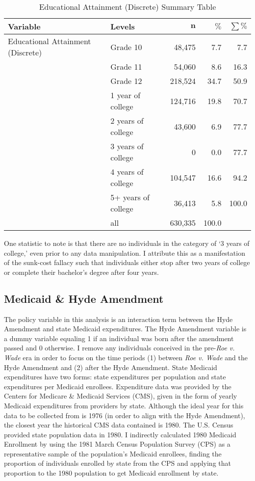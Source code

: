         \begingroup\footnotesize
        \begin{longtable}{ll|rrr}
        \caption{Educational Attainment (Discrete) Summary Table} \\
        \label{edu2_table}
         \textbf{Variable} & \textbf{Levels} & $\mathbf{n}$ & $\mathbf{\%}$ & $\mathbf{\sum \%}$ \\
          \hline
        Educational Attainment (Discrete) & Grade 10 & 48,475 & 7.7 & 7.7 \\
        & Grade 11 & 54,060 & 8.6 & 16.3 \\
        & Grade 12 & 218,524 & 34.7 & 50.9 \\
        & 1 year of college & 124,716 & 19.8 & 70.7 \\
        & 2 years of college & 43,600 & 6.9 & 77.7 \\
        & 3 years of college & 0 & 0.0 & 77.7 \\
        & 4 years of college & 104,547 & 16.6 & 94.2 \\
        & 5+ years of college & 36,413 & 5.8 & 100.0 \\
        \hline
        & all & 630,335 & 100.0 &  \\
        \hline
        \hline
        \end{longtable}
        \endgroup

        One statistic to note is that there are no individuals in the category of `3 years of college,' even prior to any data manipulation. I attribute this as a manifestation of the sunk-cost fallacy such that individuals either stop after two years of college or complete their bachelor's degree after four years.


    \subsection{Medicaid \& Hyde Amendment}
        The policy variable in this analysis is an interaction term between the Hyde Amendment and state Medicaid expenditures. The Hyde Amendment variable is a dummy variable equaling 1 if an individual was born after the amendment passed and 0 otherwise. I remove any individuals conceived in the pre-\textit{Roe v. Wade} era in order to focus on the time periods (1) between \textit{Roe v. Wade} and the Hyde Amendment and (2) after the Hyde Amendment. State Medicaid expenditures have two forms: state expenditures per population and state expenditures per Medicaid enrollees. Expenditure data was provided by the Centers for Medicare \& Medicaid Services (CMS), given in the form of yearly Medicaid expenditures from providers by state. Although the ideal year for this data to be collected from is 1976 (in order to align with the Hyde Amendment), the closest year the historical CMS data contained is 1980. The U.S. Census provided state population data in 1980. I indirectly calculated 1980 Medicaid Enrollment by using the 1981 March Census Population Survey (CPS) as a representative sample of the population's Medicaid enrollees, finding the proportion of individuals enrolled by state from the CPS and applying that proportion to the 1980 population to get Medicaid enrollment by state.

